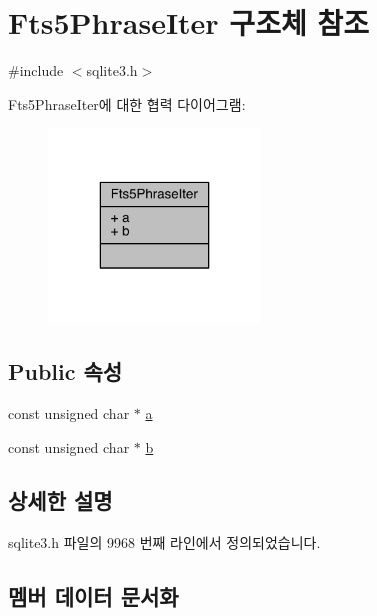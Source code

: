 \hypertarget{struct_fts5_phrase_iter}{}\section{Fts5\+Phrase\+Iter 구조체 참조}
\label{struct_fts5_phrase_iter}


{\ttfamily \#include $<$sqlite3.\+h$>$}



Fts5\+Phrase\+Iter에 대한 협력 다이어그램\+:
\nopagebreak
\begin{figure}[H]
\begin{center}
\leavevmode
\includegraphics[width=160pt]{struct_fts5_phrase_iter__coll__graph}
\end{center}
\end{figure}
\subsection*{Public 속성}
\begin{DoxyCompactItemize}
\item 
const unsigned char $\ast$ \hyperlink{struct_fts5_phrase_iter_a335969d1ac0fcbb94173c472a3f179ae}{a}
\item 
const unsigned char $\ast$ \hyperlink{struct_fts5_phrase_iter_a459180b0d670604aa38b3ac94be6adda}{b}
\end{DoxyCompactItemize}


\subsection{상세한 설명}


sqlite3.\+h 파일의 9968 번째 라인에서 정의되었습니다.



\subsection{멤버 데이터 문서화}
\mbox{\label{struct_fts5_phrase_iter_a335969d1ac0fcbb94173c472a3f179ae}} 
